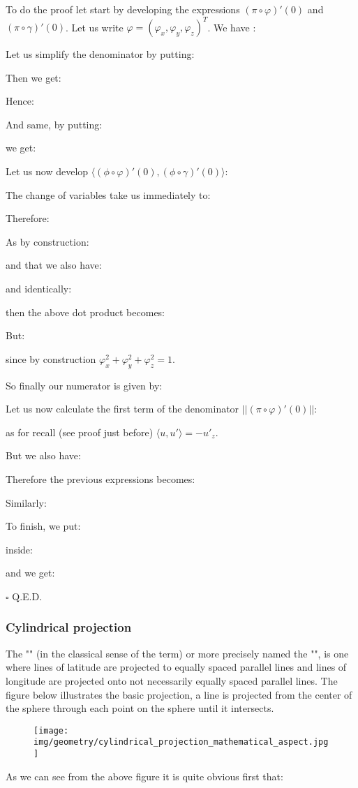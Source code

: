 	\begin{dem}
	To do the proof let start by developing the expressions $(\pi\circ\varphi)'(0)$ and $(\pi\circ\gamma)'(0)$. Let us write $\varphi=(\varphi_x,\varphi_y,\varphi_z)^T$. We have :
	
	Let us simplify the denominator by putting:
	
	Then we get:
	
	Hence:
	
	And same, by putting:
	
	we get:
	
	Let us now develop $\langle (\phi\circ\varphi)'(0),(\phi\circ\gamma)'(0)\rangle$:
	
	The change of variables take us immediately to:
	
	Therefore:
	
	As by construction:
	
	and that we also have:
	
	and identically:
	
	then the above dot product becomes:
	
	But:
	
	since by construction $\varphi_x^2+\varphi_y^2+\varphi_z^2=1$.
	
	So finally our numerator is given by:
	
	Let us now calculate the first term of the denominator $||(\pi\circ\varphi)'(0)||$:
	
	as for recall (see proof just before) $\langle u,u'\rangle=-{u'}_z$.
	
	But we also have:
	
	Therefore the previous expressions becomes:
	
	Similarly:
	
	To finish, we put:
	
	inside:
	
	and we get:
	
	\begin{flushright}
		$\square$  Q.E.D.
	\end{flushright}
	\end{dem}
	
	\pagebreak
	\subsubsection{Cylindrical projection}
	The "" (in the classical sense of the term) or more precisely named the "", is one where lines of latitude are projected to equally spaced parallel lines and lines of longitude are projected onto not necessarily equally spaced parallel lines. The figure below illustrates the basic projection, a line is projected from the center of the sphere through each point on the sphere until it intersects.
	\begin{figure}[H]
		\centering
		\texttt{[image: img/geometry/cylindrical\_projection\_mathematical\_aspect.jpg]}
	\end{figure}
	As we can see from the above figure it is quite obvious first that:
	

